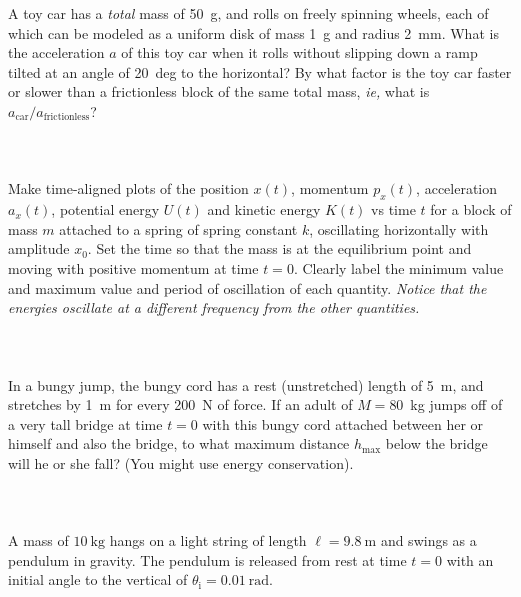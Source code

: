 \documentclass[12pt]{article}
\newcounter{problem}
\begin{document}
A toy car has a \emph{total} mass of 50~g, and rolls on freely
spinning wheels, each of which can be modeled as a uniform disk of
mass 1~g and radius 2~mm.  What is the acceleration $a$ of this toy
car when it rolls without slipping down a ramp tilted at an angle of
20~deg to the horizontal?  By what factor is the toy car faster or
slower than a frictionless block of the same total mass, \textit{ie,}
what is $a_\mathrm{car}/a_\mathrm{frictionless}$?

\paragraph{\problemname~\theproblem}

Make time-aligned plots of the position $x(t)$, momentum $p_x(t)$,
acceleration $a_x(t)$, potential energy $U(t)$ and kinetic energy
$K(t)$ vs time $t$ for a block of mass $m$ attached to a spring of
spring constant $k$, oscillating horizontally with amplitude $x_0$.
Set the time so that the mass is at the equilibrium point and moving
with positive momentum at time $t=0$.  Clearly label the minimum value
and maximum value and period of oscillation of each quantity.
\emph{Notice that the energies oscillate at a different frequency from
the other quantities.}

\paragraph{\problemname~\theproblem}

In a bungy jump, the bungy cord has a rest (unstretched) length of
5~m, and stretches by 1~m for every 200~N of force.  If an adult of
$M=80$~kg jumps off of a very tall bridge at time $t=0$ with this
bungy cord attached between her or himself and also the bridge, to
what maximum distance $h_\mathrm{max}$ below the bridge will he or she
fall?  (You might use energy conservation).

\paragraph{\problemname~\theproblem}

A mass of $10~\mathrm{kg}$ hangs on a light string of length $\ell=
9.8~\mathrm{m}$ and swings as a pendulum in gravity.  The pendulum is
released from rest at time $t=0$ with an initial angle to the vertical
of $\theta_\mathrm{i}= 0.01~\mathrm{rad}$.
\end{document}
